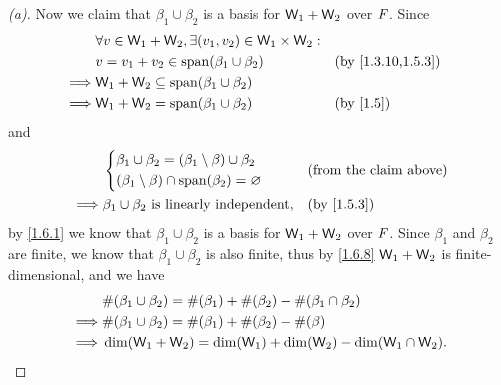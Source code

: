 \begin{proof}[(a)]
	Now we claim that \(\beta_1 \cup \beta_2\) is a basis for \(\mathsf{W}_1 + \mathsf{W}_2\) over \(\mathit{F}\).
	Since
	\begin{align*}
		         & \forall v \in \W_1 + \W_2, \exists (v_1, v_2) \in \W_1 \times \W_2 :                        \\
		         & v = v_1 + v_2 \in \spn{\beta_1 \cup \beta_2}                         &  & \by{1.3.10,1.5.3} \\
		\implies & \W_1 + \W_2 \subseteq \spn{\beta_1 \cup \beta_2}                                            \\
		\implies & \W_1 + \W_2 = \spn{\beta_1 \cup \beta_2}                             &  & \by{1.5}
	\end{align*}
	and
	\begin{align*}
		         & \begin{dcases}
			           \beta_1 \cup \beta_2 = (\beta_1 \setminus \beta) \cup \beta_2 \\
			           (\beta_1 \setminus \beta) \cap \spn{\beta_2} = \varnothing
		           \end{dcases} &  & \text{(from the claim above)}                    \\
		\implies & \beta_1 \cup \beta_2 \text{ is linearly independent},            &  & \by{1.5.3}
	\end{align*}
	by \cref{1.6.1} we know that \(\beta_1 \cup \beta_2\) is a basis for \(\mathsf{W}_1 + \mathsf{W}_2\) over \(\mathit{F}\).
	Since \(\beta_1\) and \(\beta_2\) are finite, we know that \(\beta_1 \cup \beta_2\) is also finite, thus by \cref{1.6.8} \(\mathsf{W}_1 + \mathsf{W}_2\) is finite-dimensional, and we have
	\begin{align*}
		         & \#(\beta_1 \cup \beta_2) = \#(\beta_1) + \#(\beta_2) - \#(\beta_1 \cap \beta_2) \\
		\implies & \#(\beta_1 \cup \beta_2) = \#(\beta_1) + \#(\beta_2) - \#(\beta)                \\
		\implies & \dim(\mathsf{W}_1 + \mathsf{W}_2) = \dim(\mathsf{W}_1) + \dim(\mathsf{W}_2) - \dim(\mathsf{W}_1 \cap \mathsf{W}_2).
	\end{align*}
\end{proof}

